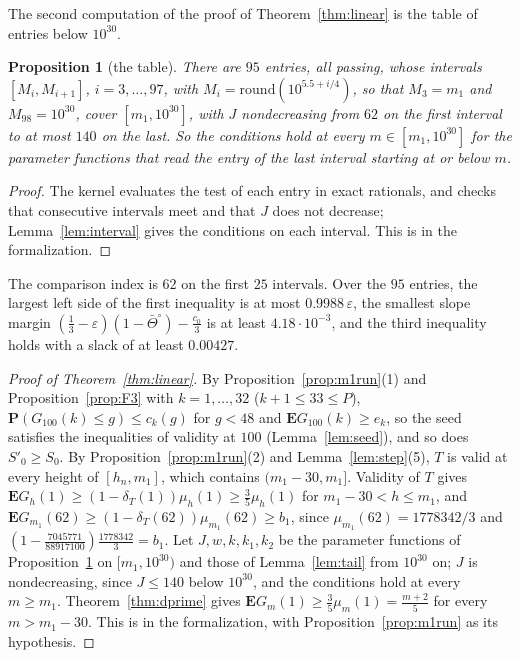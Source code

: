 \documentclass[11pt]{amsart}
\newtheorem{proposition}[theorem]{Proposition}
\theoremstyle{definition}
\numberwithin{equation}{section}
\newcommand{\lean}[1]{\ignorespaces}
\newcommand{\computed}[1]{\ignorespaces}
\newcommand{\E}{\mathbf{E}}
\renewcommand{\P}{\mathbf{P}}
\newcommand{\eps}{\varepsilon}
\begin{document}
The second computation of the proof of Theorem~\ref{thm:linear} is the table of entries below $10^{30}$.

\begin{proposition}[the table]\label{prop:dcheck}\lean{FrogModel.D3.LaneE.dcheck1_holds, FrogModel.D3.Iface.dcheck1}\computed{code/dcheck/dbranch_m1.gp, code/dcheck/dcheck_m1_cert.gp, code/dcheck/gen_table.gp}
There are $95$ entries, all passing, whose intervals $[M_i,M_{i+1}]$, $i=3,\dots,97$, with $M_i=\mathrm{round}(10^{5.5+i/4})$, so that $M_3=m_1$ and $M_{98}=10^{30}$, cover $[m_1,10^{30}]$, with $J$ nondecreasing from $62$ on the first interval to at most $140$ on the last. So the conditions hold at every $m\in[m_1,10^{30}]$ for the parameter functions that read the entry of the last interval starting at or below $m$.
\end{proposition}

\begin{proof}
The kernel evaluates the test of each entry in exact rationals, and checks that consecutive intervals meet and that $J$ does not decrease; Lemma~\ref{lem:interval} gives the conditions on each interval. This is  in the formalization.
\end{proof}

The comparison index is $62$ on the first $25$ intervals. Over the $95$ entries, the largest left side of the first inequality is at most $0.9988\,\eps$, the smallest slope margin $(\frac13-\eps)(1-\bar\Theta^\circ)-\frac{c_0}3$ is at least $4.18\cdot10^{-3}$, and the third inequality holds with a slack of at least $0.00427$.\computed{code/dcheck/gen_probe.gp, code/dcheck/run.sh, code/dcheck/out/run.out}

\begin{proof}[Proof of Theorem~\ref{thm:linear}]
By Proposition~\ref{prop:m1run}(1) and Proposition~\ref{prop:F3} with $k=1,\dots,32$ ($k+1\le33\le P$), $\P(G_{100}(k)\le g)\le c_k(g)$ for $g<48$ and $\E G_{100}(k)\ge e_k$, so the seed satisfies the inequalities of validity at $100$ (Lemma~\ref{lem:seed}), and so does $S'_0\ge S_0$. By Proposition~\ref{prop:m1run}(2) and Lemma~\ref{lem:step}(5), $T$ is valid at every height of $[h_n,m_1]$, which contains $(m_1-30,m_1]$. Validity of $T$ gives $\E G_h(1)\ge(1-\delta_T(1))\mu_h(1)\ge\frac35\mu_h(1)$ for $m_1-30<h\le m_1$, and $\E G_{m_1}(62)\ge(1-\delta_T(62))\mu_{m_1}(62)\ge b_1$, since $\mu_{m_1}(62)=1778342/3$ and $(1-\frac{7045771}{88917100})\frac{1778342}3=b_1$. Let $J,w,k,k_1,k_2$ be the parameter functions of Proposition~\ref{prop:dcheck} on $[m_1,10^{30})$ and those of Lemma~\ref{lem:tail} from $10^{30}$ on; $J$ is nondecreasing, since $J\le140$ below $10^{30}$, and the conditions hold at every $m\ge m_1$. Theorem~\ref{thm:dprime} gives $\E G_m(1)\ge\frac35\mu_m(1)=\frac{m+2}5$ for every $m>m_1-30$. This is  in the formalization, with Proposition~\ref{prop:m1run} as its hypothesis.
\end{proof}
\end{document}
